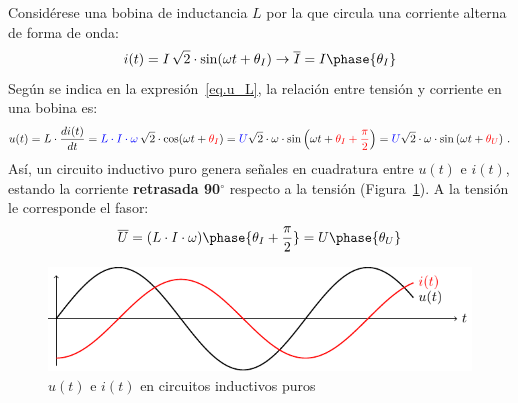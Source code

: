 \documentclass[11pt]{book} %
\begin{document}
	Considérese una bobina de inductancia $L$ por la que circula una corriente alterna de forma de onda:
	\begin{equation*}
		i(t)=I\,\sqrt{2}\cdot\sin(\omega t+\theta_I)\rightarrow\overline{I}=I\phase{\theta_I}
	\end{equation*}
	Según se indica en la expresión~\eqref{eq.u_L}, la relación entre tensión y corriente en una bobina es: 
	\begin{equation*}
		u(t)=L\cdot\dfrac{di(t)}{dt}={\color{blue}L\cdot I \cdot \omega}\,\sqrt{2}\cdot  \cos(\omega t+{\color{red}\theta_I})= {\color{blue} U} \sqrt{2}\cdot \omega\cdot  \sin \left(\omega t+{\color{red}\theta_I+\frac{\pi}{2}}\right)= {\color{blue} U} \sqrt{2}\cdot \omega\cdot  \sin \left(\omega t+{\color{red}\theta_U}\right)\,.
	\end{equation*}
	Así, un circuito inductivo puro genera señales en cuadratura entre $u(t)$ e $i(t)$, estando la corriente \textbf{retrasada 90$^\circ$} respecto a la tensión (Figura~\ref{fig.inductivoPuro}). A la tensión le corresponde el fasor:
	\begin{equation*}
		\overline{U}=(L\cdot I\cdot\omega)\phase{\theta_I+\frac{\pi}{2}}=U\phase{\theta_U}
	\end{equation*}
	\begin{figure}[htbp]
		\centering
		\includegraphics{../figs/inductivoPuro.pdf}
		\caption{$u(t)$ e $i(t)$ en circuitos inductivos puros}
		\label{fig.inductivoPuro}
	\end{figure}
	
\end{document}
